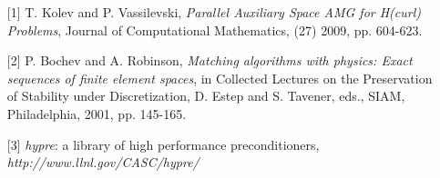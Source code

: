 \documentclass{report}
\begin{document}
\begin{itemize}

\item[][1]
{\sc T. Kolev and P. Vassilevski},
{\it Parallel Auxiliary Space AMG for H(curl) Problems}, Journal of
Computational Mathematics, (27) 2009, pp. 604-623.

\item[][2]
{\sc P. Bochev and A. Robinson},
{\it Matching algorithms with physics: Exact sequences of finite element spaces}, in
Collected Lectures on the Preservation of Stability under Discretization,
D. Estep and S. Tavener, eds., SIAM, Philadelphia, 2001, pp. 145-165.

\item[][3]
{\em hypre}: a library of high performance preconditioners, {\it
http://www.llnl.gov/CASC/hypre/}

\end{itemize}
\end{document}
